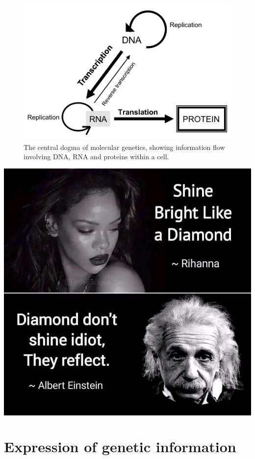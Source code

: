 \documentclass[11pt,ignorenonframetext,aspectratio=169]{beamer}
\begin{document}
\begin{frame}{}
\protect\hypertarget{section-14}{}
\begin{figure}
\includegraphics[width=0.45\linewidth]{../images/central_dogma_biology} \caption{The central dogma of molecular genetics, showing information flow involving DNA, RNA and proteins within a cell.}\label{fig:central-dogma-biology}
\end{figure}
\end{frame}

\begin{frame}{}
\protect\hypertarget{section-15}{}
\begin{center}\includegraphics[width=0.45\linewidth]{../images/diamonds_dont_shine} \end{center}
\end{frame}

\hypertarget{expression-of-genetic-information}{%
\section{Expression of genetic
information}\label{expression-of-genetic-information}}
\end{document}
